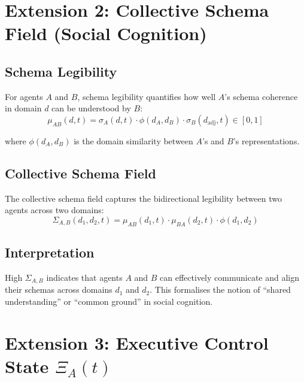 \documentclass[11pt,a4paper]{article}
\begin{document}
\section{Extension 2: Collective Schema Field (Social Cognition)}\label{app:social}

\subsection{Schema Legibility}

For agents $A$ and $B$, schema legibility quantifies how well $A$'s
schema coherence in domain $d$ can be understood by $B$:
\begin{equation}\label{app:eq:schema-legibility}
\mu_{AB}(d,t) = \sigma_A(d,t) \cdot \phi(d_A, d_B) \cdot \sigma_B(d_{\text{adj}},t) \in [0,1]
\end{equation}

where $\phi(d_A, d_B)$ is the domain similarity between $A$'s and $B$'s
representations.

\subsection{Collective Schema Field}

The collective schema field captures the bidirectional legibility
between two agents across two domains:
\begin{equation}\label{app:eq:collective-field}
\Sigma_{A,B}(d_1,d_2,t) = \mu_{AB}(d_1,t) \cdot \mu_{BA}(d_2,t) \cdot \phi(d_1,d_2)
\end{equation}

\subsection{Interpretation}

High $\Sigma_{A,B}$ indicates that agents $A$ and $B$ can effectively
communicate and align their schemas across domains $d_1$ and $d_2$.
This formalises the notion of ``shared understanding'' or ``common ground''
in social cognition.

\section{Extension 3: Executive Control State $\Xi_A(t)$}\label{app:executive}
\end{document}
